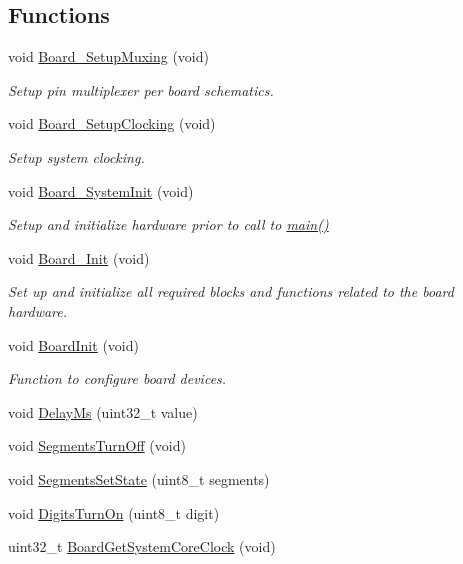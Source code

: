 \subsection*{Functions}
\begin{DoxyCompactItemize}
\item 
void \hyperlink{group__hal_ga8ac1dc465c66e1cc00f5ffd346904d97}{Board\+\_\+\+Setup\+Muxing} (void)
\begin{DoxyCompactList}\small\item\em Setup pin multiplexer per board schematics. \end{DoxyCompactList}\item 
void \hyperlink{group__hal_gae417dc93d00f1a89f74220e569fac777}{Board\+\_\+\+Setup\+Clocking} (void)
\begin{DoxyCompactList}\small\item\em Setup system clocking. \end{DoxyCompactList}\item 
void \hyperlink{group__hal_gaeb60ea85499a4208167ae2540086516a}{Board\+\_\+\+System\+Init} (void)
\begin{DoxyCompactList}\small\item\em Setup and initialize hardware prior to call to \hyperlink{group__samples_ga840291bc02cba5474a4cb46a9b9566fe}{main()} \end{DoxyCompactList}\item 
void \hyperlink{group__hal_gae8d2d761b984f48c3dbb27dd32a8c119}{Board\+\_\+\+Init} (void)
\begin{DoxyCompactList}\small\item\em Set up and initialize all required blocks and functions related to the board hardware. \end{DoxyCompactList}\item 
void \hyperlink{group__hal_gad24575a3bcf2c2433e7720830d813e64}{Board\+Init} (void)
\begin{DoxyCompactList}\small\item\em Function to configure board devices. \end{DoxyCompactList}\item 
void \hyperlink{group__hal_gace922d758774792e0573b7c568fe2a3f}{Delay\+Ms} (uint32\+\_\+t value)
\item 
void \hyperlink{group__hal_ga76d9235760f7648a267f3b754ec0abf7}{Segments\+Turn\+Off} (void)
\item 
void \hyperlink{group__hal_gae15c80f1fc4f726afc46735ce5a60877}{Segments\+Set\+State} (uint8\+\_\+t segments)
\item 
void \hyperlink{group__hal_gab32fd447ccc48c0f3b71bcf5f7700d25}{Digits\+Turn\+On} (uint8\+\_\+t digit)
\item 
uint32\+\_\+t \hyperlink{group__hal_ga736805438a3d3b44d06eb01ab1932324}{Board\+Get\+System\+Core\+Clock} (void)
\end{DoxyCompactItemize}
